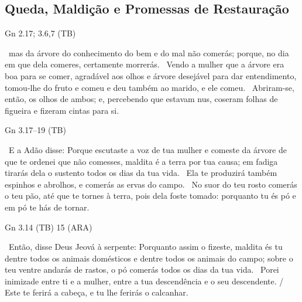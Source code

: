 \documentclass[12pt,aspectratio=169]{beamer}
\newcommand{\ver}[1]{%
    \raisebox{0.50ex}{%
        \scalebox{1.1}{%
            \pmb{\textbf{\textcolor{BSpbg}{#1}}}%
        }%
    }%
}
\newcommand{\QUOTE}[1]{%
    \par\noindent\hspace*{0.05\linewidth}%
    \begin{minipage}{0.9\linewidth}%
        \linespread{1.35}\large{#1}%
    \end{minipage}%
}
\newcommand{\RED}[1]{{\textcolor{TXred}{#1}}}
\newcommand{\YEL}[1]{{\textcolor{TXyel}{#1}}}
\begin{document}
    \subsection{Queda, Maldição e Promessas de Restauração}

    \begin{frame}{Gn 2.17; 3.6,7 (TB)}
        \QUOTE{%
            \ver{2.17}~mas da árvore do \YEL{conhecimento} do \YEL{bem} e do \YEL{mal} não
            comerás; porque, no dia em que dela comeres, certamente morrerás.
            \ver{3.6}~Vendo a mulher que a árvore era boa para se comer, agradável aos olhos e
            árvore \RED{desejável para dar entendimento}, tomou-lhe do fruto e \RED{comeu} e deu
            também ao marido, e ele \RED{comeu}.
            \ver{3.7}~Abriram-se, então, os olhos de ambos; e, \YEL{percebendo} que estavam nus,
            \YEL{coseram} folhas de figueira \YEL{e fizeram} cintas para si.
        }
    \end{frame}

    \begin{frame}{Gn 3.17--19 (TB)}
        \QUOTE{%
            \ver{17}~E a Adão disse: Porque escutaste a voz de tua mulher e comeste da árvore de
            que te ordenei que não comesses, \RED{maldita é a terra por tua causa}; em fadiga
            tirarás dela o sustento todos os \RED{dias da tua vida}.
            \ver{18}~Ela te produzirá também \RED{espinhos e abrolhos}, e comerás as ervas do
            campo.
            \ver{19}~No \RED{suor do teu rosto comerás o teu pão}, até que te tornes à terra,
            pois dela foste tomado: porquanto \RED{tu és pó e em pó te hás de tornar}.
        }
    \end{frame}

    \begin{frame}{Gn 3.14 (TB) 15 (ARA)}
        \QUOTE{%
            \ver{14}~Então, disse Deus Jeová à \RED{serpente}: Porquanto assim o fizeste,
            \RED{maldita és} tu dentre todos os animais domésticos e dentre todos os animais do
            campo; sobre o teu ventre andarás de rastos, o pó comerás todos os \RED{dias da tua
            vida}.
            \ver{15}~Porei inimizade entre \RED{ti} e a \YEL{mulher}, entre a \RED{tua
            descendência} e \YEL{o seu descendente}.  / \YEL{Este te ferirá a cabeça}, e \RED{tu
            lhe ferirás o calcanhar}.
        }
    \end{frame}
\end{document}
